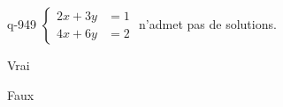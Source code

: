\begin{truefalse}{q-949}
$\begin{cases}2x+3y &= 1 \\ 4x+6y &= 2\end{cases}$ n'admet pas de solutions.
\item Vrai
\item* Faux
\end{truefalse}

